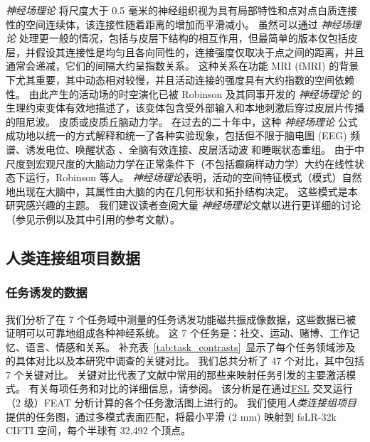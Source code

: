\documentclass[lang=cn,a4paper,newtx,citestyle=gb7714-2015, bibstyle=gb7714-2015]{elegantpaper}
\begin{document}
\textit{神经场理论} 将尺度大于 0.5 毫米的神经组织视为具有局部特性和点对点白质连接性的空间连续体，该连接性随着距离的增加而平滑减小。
虽然可以通过 \textit{神经场理论} 处理更一般的情况，包括与皮层下结构的相互作用\cite{robinson2005multiscale,sanz2018nftsim}，但最简单的版本仅包括皮层，并假设其连接性是均匀且各向同性的，连接强度仅取决于点之间的距离，并且通常会递减，它们的间隔大约呈指数关系\cite{deco2008dynamic,braitenberg2013cortex,henderson2014relations,robinson2019physical}。
这种关系在功能 MRI (fMRI) 的背景下尤其重要，其中动态相对较慢，并且活动连接的强度具有大约指数\cite{braitenberg2013cortex,robinson2019physical,robinson2012interrelating}的空间依赖性。
由此产生的活动场的时空演化已被 Robinson 及其同事开发的 \textit{神经场理论} 的生理约束变体有效地描述了\cite{beurle1956properties,da1976models,jirsa1996field,robinson1997propagation,nunez1974brain}，该变体包含受外部输入和本地刺激后穿过皮层片传播的阻尼波。
皮质或皮质丘脑动力学。
在过去的二十年中，这种 \textit{神经场理论} 公式成功地以统一的方式解释和统一了各种实验现象，包括但不限于脑电图 (EEG) 频谱\cite{robinson2001prediction,pang2018neural}、诱发电位\cite{rennie2002unified,mukta2020evoked}、唤醒状态\cite{abeysuriya2015physiologically,assadzadeh2018necessity} 、全脑有效连接\cite{robinson2012interrelating}、皮层活动波\cite{gabay2018dynamics} 和睡眠状态重组\cite{robinson2005multiscale}。
由于中尺度到宏观尺度的大脑动力学在正常条件下（不包括癫痫样动力学）\cite{robinson2019physical}大约在线性状态下运行，Robinson 等人。
\textit{神经场理论}表明，活动的空间特征模式（模式）自然地出现在大脑中\cite{wang2016brain,roberts2017consistency}，其属性由大脑的内在几何形状和拓扑结构决定\cite{preti2019decoupling,gabay2018dynamics}。
这些模式是本研究感兴趣的主题。
我们建议读者查阅大量 \textit{神经场理论}文献以进行更详细的讨论（参见示例\cite{wright1995simulation,jirsa1996field,robinson1997propagation,robinson2016eigenmodes,gabay2017cortical,wang2016brain,honey2007network,van2013wu,glasser2016multi,naze2021robustness}以及其中引用的参考文献）。



\subsection{人类连接组项目数据} \label{sec:sup_2}

\subsubsection{任务诱发的数据} \label{sec:sup_2_1}

我们分析了在 7 个任务域中测量的任务诱发功能磁共振成像数据，这些数据已被证明可以可靠地组成各种神经系统\cite{barch2013function}。
这 7 个任务是：社交、运动、赌博、工作记忆、语言、情感和关系。
补充表~\ref{tab:task_contrasts}~显示了每个任务领域涉及的具体对比以及本研究中调查的关键对比。
我们总共分析了 47 个对比，其中包括 7 个关键对比。
关键对比代表了文献中常用的那些来映射任务引发的主要激活模式。
有关每项任务和对比的详细信息，请参阅\cite{barch2013function}。
该分析是在通过\href{https://fsl.fmrib.ox.ac.uk/}{FSL} 交叉运行（2 级）FEAT 分析\cite{woolrich2004multilevel}计算的各个任务激活图上进行的。
我们使用\textit{人类连接组项目}提供的任务图，通过多模式表面匹配\cite{robinson2018multimodal}，将最小平滑 (2 mm) 映射到 fsLR-32k CIFTI 空间，每个半球有 32,492 个顶点。
\end{document}
